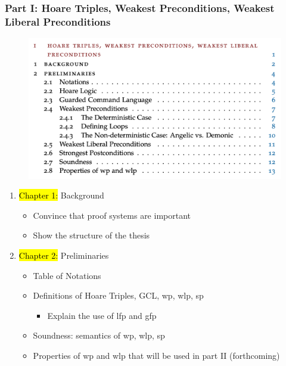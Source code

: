 \documentclass[aspectratio=169]{beamer}
\begin{document}
\begin{frame}[fragile]
	\frametitle{Part I: Hoare Triples, Weakest Preconditions, Weakest Liberal
Preconditions}
	\begin{minipage}[t]{0.49\linewidth}	
		\begin{figure}
			\centering \includegraphics[width=\textwidth]{images/part1.png} 
	  \end{figure}
	\end{minipage}
	\begin{minipage}[t]{0.5\linewidth}
		\begin{enumerate}
			\item[] \hl{Chapter 1: }Background 
			\begin{itemize}
				\item Convince that proof systems are important
				\item Show the structure of the thesis
			\end{itemize}
			\item[] \hl{Chapter 2: }Preliminaries
			\begin{itemize}
				\item Table of Notations 
				\item Definitions of Hoare Triples, GCL, wp, wlp, sp
				\begin{itemize}
					\item Explain the use of lfp and gfp
				\end{itemize}
				\item Soundness: semantics of wp, wlp, sp
				\item Properties of wp and wlp that will be used in part II (forthcoming)
			\end{itemize}
		\end{enumerate}
	\end{minipage}
\end{frame}
\end{document}
